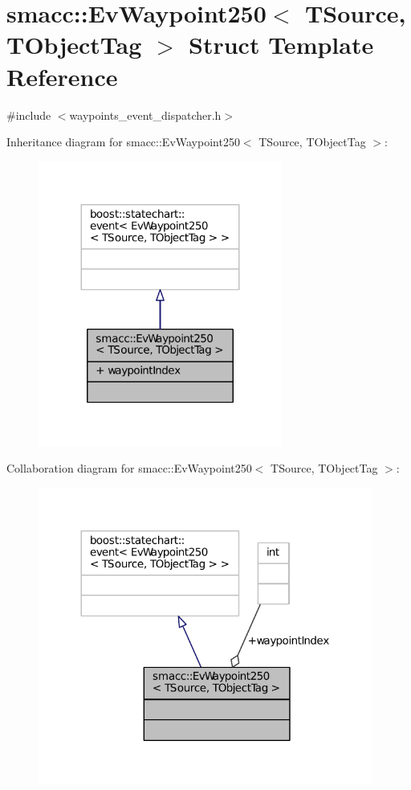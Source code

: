 \hypertarget{structsmacc_1_1EvWaypoint250}{}\section{smacc\+:\+:Ev\+Waypoint250$<$ T\+Source, T\+Object\+Tag $>$ Struct Template Reference}
\label{structsmacc_1_1EvWaypoint250}


{\ttfamily \#include $<$waypoints\+\_\+event\+\_\+dispatcher.\+h$>$}



Inheritance diagram for smacc\+:\+:Ev\+Waypoint250$<$ T\+Source, T\+Object\+Tag $>$\+:
\nopagebreak
\begin{figure}[H]
\begin{center}
\leavevmode
\includegraphics[width=227pt]{structsmacc_1_1EvWaypoint250__inherit__graph}
\end{center}
\end{figure}


Collaboration diagram for smacc\+:\+:Ev\+Waypoint250$<$ T\+Source, T\+Object\+Tag $>$\+:
\nopagebreak
\begin{figure}[H]
\begin{center}
\leavevmode
\includegraphics[width=312pt]{structsmacc_1_1EvWaypoint250__coll__graph}
\end{center}
\end{figure}
